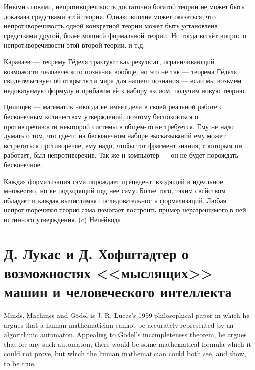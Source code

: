 \documentclass[12pt, specialist, subf, substylefile = spbu.rtx]{disser}
\begin{document}
Иными словами, непротиворечивость достаточно богатой теории не может быть доказана средствами этой теории. Однако вполне может оказаться, что непротиворечивость одной конкретной теории может быть установлена средствами другой, более мощной формальной теории. Но тогда встаёт вопрос о непротиворечивости этой второй теории, и т.д.

Караваев — теорему Гёделя трактуют как результат, ограничивающий возможости человеческого познания вообще, но это не так — теорема Гёделя свидетельствует об открытости мира для нашего познания — если мы возьмём недоказуемую формулу и прибавим её к набору аксиом, получим новую теорию.

Цилищев — математик никогда не имеет дела в своей реальной работе с бесконечным количеством утверждений, поэтому беспокоиться о противоречивости некоторой системы в общем-то не требуется. Ему не надо думать о том, что где-то на бесконечном наборе высказываний ему может встретиться противоречие, ему надо, чтобы тот фрагмент знания, с которым он работает, был непротиворечив. Так же и компьютер — он не будет порождать бесконечное.

Каждая формализация сама порождает прецедент, входящий в идеальное множество, но не подходящий под нее саму. Более того, таким свойством обладает и каждая вычислимая последовательность формализаций. Любая непротиворечивая теория сама помогает построить пример неразрешимого в ней истинного утверждения. (c) Непейвода


\section{Д. Лукас и Д. Хофштадтер о возможностях <<мыслящих>> машин и человеческого интеллекта}

Minds, Machines and Gödel is J. R. Lucas's 1959 philosophical paper in which he argues that a human mathematician cannot be accurately represented by an algorithmic automaton. Appealing to Gödel's incompleteness theorem, he argues that for any such automaton, there would be some mathematical formula which it could not prove, but which the human mathematician could both see, and show, to be true.
\end{document}
